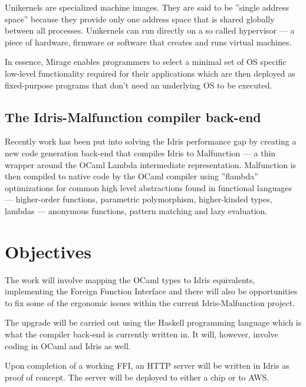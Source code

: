 \documentclass[a4paper]{report}
\begin{document}
Unikernels are specialized machine images.
They are said to be ''single address space'' because they provide only one
address space that is shared globally between all processes.
Unikernels can run directly on a so called hypervisor --- a piece of hardware,
firmware or software that creates and runs virtual machines.

In essence, Mirage enables programmers to select a minimal set of OS specific
low-level functionality required for their applications which are then deployed
as fixed-purpose programs that don't need an underlying OS to be executed.

\subsection{The Idris-Malfunction compiler back-end}
Recently work has been put into solving the Idris performance gap by creating a
new code generation back-end that compiles Idris to Malfunction --- a thin
wrapper around the OCaml Lambda intermediate representation.
Malfunction is then compiled to native code by the OCaml compiler using
''flambda'' optimizations for common high level abstractions found in functional languages --- higher-order functions, parametric polymorphism,
higher-kinded types, lambdas --- anonymous functions, pattern matching and
lazy evaluation.




\section{Objectives}

The work will involve mapping the OCaml types to Idris equivalents,
implementing the Foreign Function Interface and there will also be
opportunities to fix some of the ergonomic issues within the current
Idris-Malfunction project.

The upgrade will be carried out using the Haskell programming language which is
what the compiler back-end is currently written in.
It will, however, involve coding in OCaml and Idris as well.

Upon completion of a working FFI, an HTTP server will be written in Idris as
proof of concept.
The server will be deployed to either a chip or to AWS.
\end{document}
